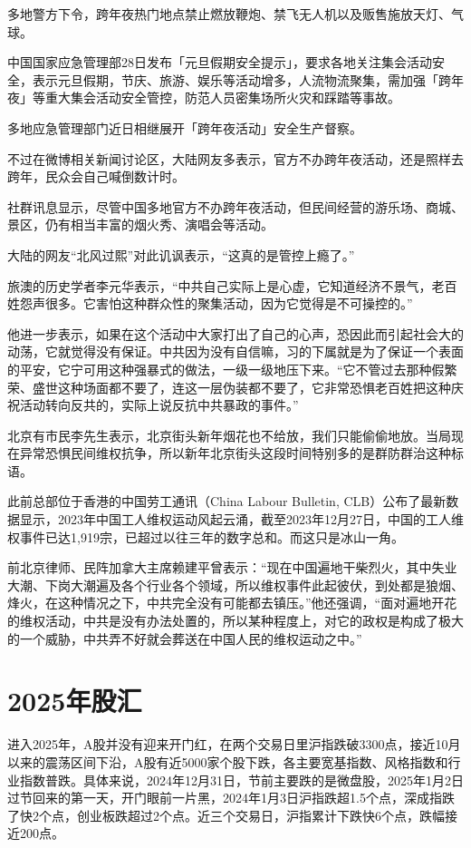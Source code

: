 多地警方下令，跨年夜热门地点禁止燃放鞭炮、禁飞无人机以及贩售施放天灯、气球。

中国国家应急管理部28日发布「元旦假期安全提示」，要求各地关注集会活动安全，表示元旦假期，节庆、旅游、娱乐等活动增多，人流物流聚集，需加强「跨年夜」等重大集会活动安全管控，防范人员密集场所火灾和踩踏等事故。

多地应急管理部门近日相继展开「跨年夜活动」安全生产督察。

不过在微博相关新闻讨论区，大陆网友多表示，官方不办跨年夜活动，还是照样去跨年，民众会自己喊倒数计时。

社群讯息显示，尽管中国多地官方不办跨年夜活动，但民间经营的游乐场、商城、景区，仍有相当丰富的烟火秀、演唱会等活动。 

大陆的网友“北风过熙”对此讥讽表示，“这真的是管控上瘾了。”

旅澳的历史学者李元华表示，“中共自己实际上是心虚，它知道经济不景气，老百姓怨声很多。它害怕这种群众性的聚集活动，因为它觉得是不可操控的。”

他进一步表示，如果在这个活动中大家打出了自己的心声，恐因此而引起社会大的动荡，它就觉得没有保证。中共因为没有自信嘛，习的下属就是为了保证一个表面的平安，它宁可用这种强暴式的做法，一级一级地压下来。“它不管过去那种假繁荣、盛世这种场面都不要了，连这一层伪装都不要了，它非常恐惧老百姓把这种庆祝活动转向反共的，实际上说反抗中共暴政的事件。”

北京有市民李先生表示，北京街头新年烟花也不给放，我们只能偷偷地放。当局现在异常恐惧民间维权抗争，所以新年北京街头这段时间特别多的是群防群治这种标语。

此前总部位于香港的中国劳工通讯（China Labour Bulletin, CLB）公布了最新数据显示，2023年中国工人维权运动风起云涌，截至2023年12月27日，中国的工人维权事件已达1,919宗，已超过以往三年的数字总和。而这只是冰山一角。

前北京律师、民阵加拿大主席赖建平曾表示：“现在中国遍地干柴烈火，其中失业大潮、下岗大潮遍及各个行业各个领域，所以维权事件此起彼伏，到处都是狼烟、烽火，在这种情况之下，中共完全没有可能都去镇压。”他还强调，“面对遍地开花的维权活动，中共是没有办法处置的，所以某种程度上，对它的政权是构成了极大的一个威胁，中共弄不好就会葬送在中国人民的维权运动之中。”

\section{2025年股汇}

进入2025年，A股并没有迎来开门红，在两个交易日里沪指跌破3300点，接近10月以来的震荡区间下沿，A股有近5000家个股下跌，各主要宽基指数、风格指数和行业指数普跌。具体来说，2024年12月31日，节前主要跌的是微盘股，2025年1月2日过节回来的第一天，开门眼前一片黑，2024年1月3日沪指跌超1.5个点，深成指跌了快2个点，创业板跌超过2个点。近三个交易日，沪指累计下跌快6个点，跌幅接近200点。

